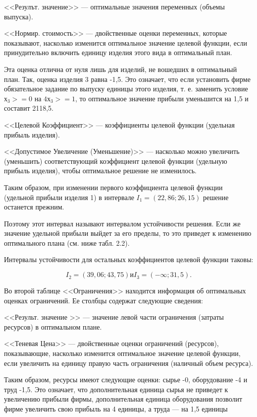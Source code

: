<<Резулът. значение>> --- оптимальные значения переменных (объемы выпуска).

<<Нормир. стоимость>> --- двойственные оценки переменных, которые показывают, насколько изменится оптимальное значение целевой функ­ции, если принудительно включить единицу изделия этого вида в оптимальный план.

Эта оценка отлична от нуля лишь для изделий, не вошедших в оптимальный план. Так, оценка изделия 3 равна -1,5. Это означает, что если установить фирме обязательное задание по выпуску единицы этого изделия, т. е. заменить условие $х_3 >= 0$ на $4х_3 >= 1$, то оптимальное значение прибыли уменьшится на 1,5 и составит 2118,5.

<<Целевой Коэффициент>> --- коэффициенты целевой функции (удельная прибыль изделия).

<<Допустимое Увеличение (Уменьшение)>> --- насколько можно увеличить (уменьшить) соответствующий коэффициент целевой функции (удельную прибыль изделия), чтобы оптимальное решение не изменилось.

Таким образом, при изменении первого коэффициента целевой функции (удельной прибыли изделия 1) в интервале $I_1= (22,86; 26,15)$ решение останется прежним.

Поэтому этот интервал называют интервалом устойчивости решения. Если же значение удельной прибыли выйдет за его пределы, то это приведет к изменению оптимального плана (см. ниже табл. 2.2).

Интервалы устойчивости для остальных коэффициентов целевой функции таковы:

\[ I_2 = (39, 06 ; 43,75) \text{и} I_3 = ( -\infty ;31,5). \]

Во второй таблице <<Ограничения>> находится информация об оптимальных оценках ограничений. Ее столбцы содержат следующие сведения:

<<Результ. значение >> --- значение левой части ограничения (затраты ресурсов) в оптимальном плане.

<<Теневая Цена>> --- двойственные оценки ограничений (ресурсов), показывающие, насколько изменится оптимальное значение целевой функции, если увеличить на единицу правую часть ограничения (наличный объем ресурса).

Таким образом, ресурсы имеют следующие оценки: сырье -0, оборудование -4 и труд -1,5. Это означает, что дополнительная единица сырья не приведет к увеличению прибыли фирмы, дополнительная единица оборудования позволит фирме увеличить свою прибыль на 4 единицы, а труда --- на 1,5 единицы



